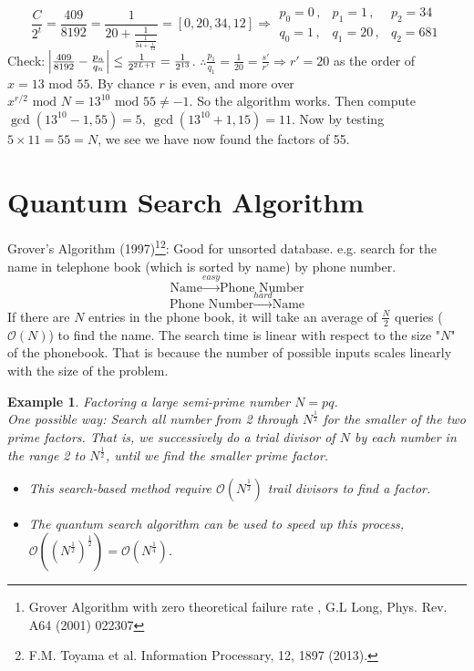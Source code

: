\documentclass[]{book}
\newtheorem*{example}{Example}
\theoremstyle{nonumberplain}
\begin{document}
\begin{enumerate}
        \[
        \frac{C}{2^t}=\frac{409}{8192}=\frac{1}{20+\frac{1}{\frac{1}{34+\frac{1}{12}}}}=[0,20,34,12] \Rightarrow 
        \begin{matrix}
            p_0 = 0\,, & p_1 = 1\,, & p_2 = 34\\
            q_0 = 1\,, & q_1 = 20\,, & q_2 = 681
        \end{matrix}
        \]
        Check: $\abs{\frac{409}{8192}-\frac{p_n}{q_n}} \leq \frac{1}{2^{2L+1}} = \frac{1}{2^{13}}$.
        $\therefore \frac{p_1}{q_1}=\frac{1}{20}=\frac{s'}{r'} \Rightarrow r'=20$ as the order of $x=13 \text{ mod }55$.
        By chance $r$ is even, and more over $x^{r/2} \text{ mod }N = 13^{10} \text{ mod }55 \neq -1$. So the algorithm works. Then compute $\gcd(13^{10}-1,55)=5, \ \gcd(13^{10}+1,15)=11$. Now by testing $5 \times 11 = 55 = N$, we see we have now found the factors of 55.
    \end{enumerate}
    
\section{Quantum Search Algorithm}
Grover's Algorithm (1997)\footnote{Grover Algorithm with zero theoretical failure rate
, G.L Long, Phys. Rev. A64 (2001) 022307}\footnote{F.M. Toyama et al. Information Processary, 12, 1897 (2013).}: Good for unsorted database. e.g. search for the name in telephone book (which is sorted by name) by phone number.
$$\text{Name} \xrightarrow{easy} \text{Phone Number}$$
$$\text{Phone Number} \xrightarrow{hard} \text{Name}$$
If there are $N$ entries in the phone book, it will take an average of $\frac{N}{2}$ queries ($\mathcal{O}(N)$) to find the name. The search time is linear with respect to the size "$N$" of the phonebook. That is because the number of possible inputs scales linearly with the size of the problem.

\begin{example}
    Factoring a large semi-prime number $N=pq$.\\
    One possible way: Search all number from 2 through $N^{\frac{1}{2}}$ for the smaller of the two prime factors. That is, we successively do a trial divisor of $N$ by each number in the range 2 to $N^{\frac{1}{2}}$, until we find the smaller prime factor.
    \begin{itemize}
        \item This search-based method require $\mathcal{O}(N^{\frac{1}{2}})$ trail divisors to find a factor.
        \item The quantum search algorithm can be used to speed up this process, $\mathcal{O}((N^{\frac{1}{2}})^{\frac{1}{2}})=\mathcal{O}(N^{\frac{1}{4}})$.
    \end{itemize}
\end{example}
\end{document}

